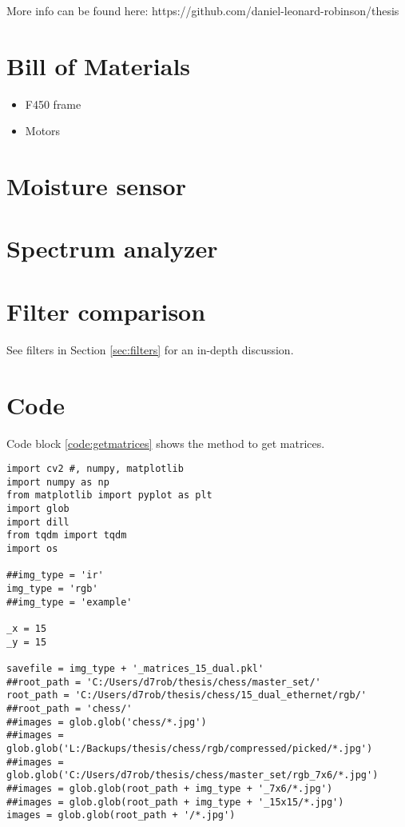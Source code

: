 \begin{appendices}

More info can be found here: https://github.com/daniel-leonard-robinson/thesis

\chapter{Bill of Materials}

\begin{itemize}
	\item F450 frame
	\item Motors
\end{itemize}

\chapter{Moisture sensor}
\chapter{Spectrum analyzer}

\chapter{Filter comparison}
\label{app:filter_comparison}

See filters in Section \ref{sec:filters} for an in-depth discussion.

\chapter{Code}

Code block \ref{code:getmatrices} shows the method to get matrices.

\begin{lstlisting}
import cv2 #, numpy, matplotlib
import numpy as np
from matplotlib import pyplot as plt
import glob
import dill
from tqdm import tqdm
import os

##img_type = 'ir'
img_type = 'rgb'
##img_type = 'example'

_x = 15
_y = 15

savefile = img_type + '_matrices_15_dual.pkl'
##root_path = 'C:/Users/d7rob/thesis/chess/master_set/'
root_path = 'C:/Users/d7rob/thesis/chess/15_dual_ethernet/rgb/'
##root_path = 'chess/'
##images = glob.glob('chess/*.jpg')
##images = glob.glob('L:/Backups/thesis/chess/rgb/compressed/picked/*.jpg')
##images = glob.glob('C:/Users/d7rob/thesis/chess/master_set/rgb_7x6/*.jpg')
##images = glob.glob(root_path + img_type + '_7x6/*.jpg')
##images = glob.glob(root_path + img_type + '_15x15/*.jpg')
images = glob.glob(root_path + '/*.jpg')


\end{lstlisting}
\end{appendices}

